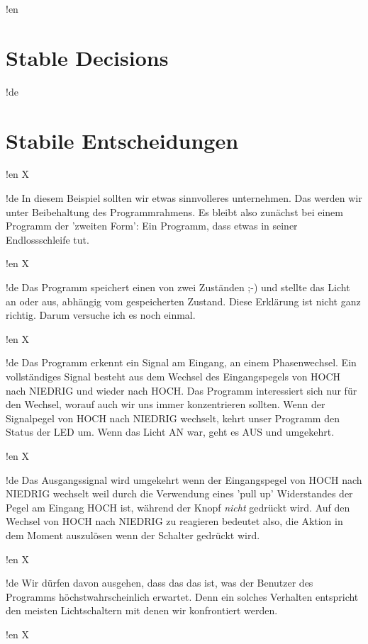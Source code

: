 !en \section{Stable Decisions}
!de \section{Stabile Entscheidungen}



!en X

!de In diesem Beispiel sollten wir etwas sinnvolleres unternehmen. Das werden wir unter Beibehaltung des Programmrahmens. Es bleibt also zunächst bei einem Programm der 'zweiten Form': Ein Programm, dass etwas in seiner Endlossschleife tut.



!en X

!de Das Programm speichert einen von zwei Zuständen ;-) und stellte das Licht an oder aus, abhängig vom gespeicherten Zustand. Diese Erklärung ist nicht ganz richtig. Darum versuche ich es noch einmal.



!en X

!de Das Programm erkennt ein Signal am Eingang, an einem Phasenwechsel. Ein vollständiges Signal besteht aus dem Wechsel des Eingangspegels von HOCH nach NIEDRIG und wieder nach HOCH. Das Programm interessiert sich nur für den Wechsel, worauf auch wir uns immer konzentrieren sollten. Wenn der Signalpegel von HOCH nach NIEDRIG wechselt, kehrt unser Programm den Status der LED um. Wenn das Licht AN war, geht es AUS und umgekehrt. 



!en X

!de Das Ausgangssignal wird umgekehrt wenn der Eingangspegel von HOCH nach NIEDRIG wechselt weil durch die Verwendung eines 'pull up' Widerstandes der Pegel am Eingang HOCH ist, während der Knopf \textit{nicht} gedrückt wird. Auf den Wechsel von HOCH nach NIEDRIG zu reagieren bedeutet also, die Aktion in dem Moment auszulösen wenn der Schalter gedrückt wird.



!en X

!de Wir dürfen davon ausgehen, dass das das ist, was der Benutzer des Programms höchstwahrscheinlich erwartet. Denn ein solches Verhalten entspricht den meisten Lichtschaltern mit denen wir konfrontiert werden.



!en X

